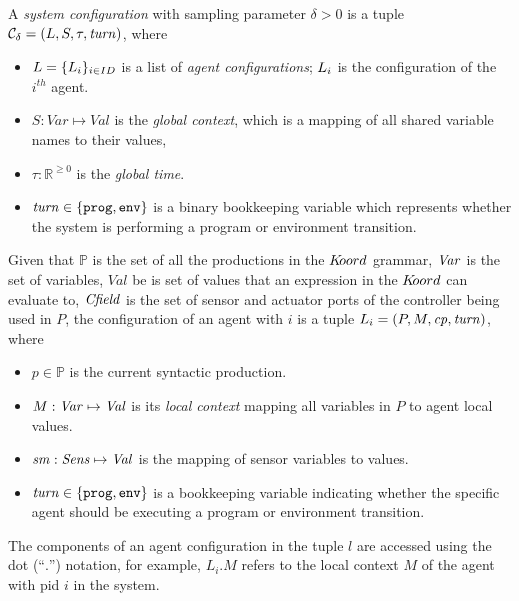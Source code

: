 A {\em system configuration\/} with sampling parameter $\delta>0$ is a tuple 
$\mathcal{C}_\delta = (L,{S},\tau,\mathit{turn})$, where
\begin{itemize}
	\item ${L} = \{L_{i}\}_{i\in ID}$ is a list of {\em agent configurations\/}; $L_{i}$ is the  configuration of the $i^{\mathit{th}}$ agent.
	\item ${S} : \mathit{Var} \mapsto \mathit{Val}$ is the {\em global context\/}, which is a mapping of all shared variable names to their values, 
	\item  $\tau:\mathbb{R}^{\geq 0}$ is the {\em global time\/}.
	\item $\mathit{turn}\in\{\mathtt{prog,env}\}$ is a binary bookkeeping variable which represents whether the system is performing a program or environment transition. 
\end{itemize}


Given that $\mathbb{P}$ is the set of all the productions in the $K\kern-2pt oord$ grammar, $\mathit{Var}$ is the set of variables, $Val$ be is set of values that an expression in the $K\kern-2pt oord$ can evaluate to, $\mathit{Cfield}$ is the set of sensor and actuator ports of the controller being used in $P$, the configuration of an agent with $\mathit{i}$ is a tuple $ L_i = (P, {M},\mathit{cp},\mathit{turn})$, where
\begin{itemize}
 \item $p \in \mathbb{P}$ is the current syntactic production.
\item ${M} : \mathit{Var} \mapsto \mathit{Val}$ is its {\em local context\/} mapping all variables in $P$ to agent local values.
 \item $\mathit{sm} : \mathit{Sens} \mapsto \mathit{Val}$ is the mapping of sensor variables to values.
 \item $\mathit{turn} \in \{\mathtt{prog,env}\}$ is a bookkeeping variable indicating whether the specific agent should be executing a program or environment transition. 
\end{itemize}
The components of an agent configuration in the tuple $l$ are accessed
using the dot (``$.$'') notation, for example, $L_i.M$ refers to the local context $M$ of the agent with pid $i$ in the system.
